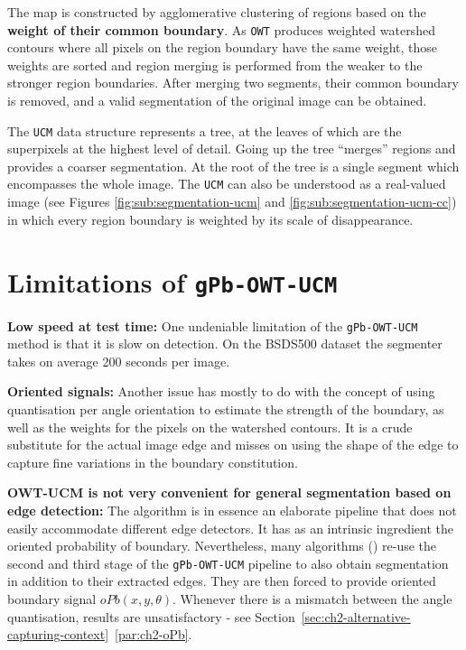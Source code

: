 The map is constructed by agglomerative clustering of regions based on the {\bf weight of their common boundary}. As {\tt OWT} produces weighted watershed contours where all pixels on the region boundary have the same weight, those weights are sorted and region merging is performed from the weaker to the stronger region boundaries. After merging two segments, their common boundary is removed, and a valid segmentation of the original image can be obtained.

The {\tt UCM} data structure represents a tree, at the leaves of which are the superpixels at the highest level of detail. Going up the tree ``merges'' regions and provides a coarser segmentation. At the root of the tree is a single segment which encompasses the whole image. The {\tt UCM} can also be understood as a real-valued image (see Figures \ref{fig:sub:segmentation-ucm} and \ref{fig:sub:segmentation-ucm-cc}) in which every region boundary is weighted by its scale of disappearance.


\section{Limitations of {\tt gPb-OWT-UCM}} %
\textbf{Low speed at test time:} One undeniable %
limitation of the {\tt gPb-OWT-UCM} method is that it is slow on detection. On the BSDS500 dataset the segmenter takes on average 200 seconds per image.

\textbf{Oriented signals:} %
Another issue has mostly to do with the concept of using quantisation per angle orientation to estimate the strength of the boundary, as well as the weights for the pixels on the watershed contours. %
It is a crude substitute for the actual image edge and misses on using the shape of the edge to capture fine variations in the boundary constitution. %

\textbf{OWT-UCM is not very convenient for general segmentation based on edge detection:} The algorithm is in essence an elaborate pipeline that does not easily accommodate different edge detectors. It has as an intrinsic ingredient the oriented probability of boundary. Nevertheless, many algorithms (\eg \cite{Kisilev2013Learning,Arbelaez2014multiscale,Isola2014crisp,Hallman2014}) re-use the second and third stage of the {\tt gPb-OWT-UCM} pipeline to also obtain segmentation in addition to their extracted edges. They are then forced to provide oriented boundary signal $oPb(x,y,\theta)$. Whenever there is a mismatch between the angle quantisation, results are %
unsatisfactory %
- see Section~\ref*{sec:ch2-alternative-capturing-context}~\ref{par:ch2-oPb}.


